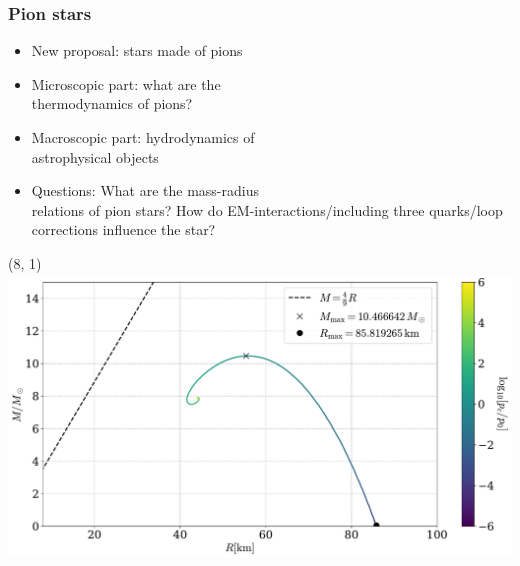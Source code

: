 \documentclass[aspectratio=169]{beamer}
\author{Martin Johnsrud}
\begin{document}

    \begin{frame}
        \frametitle{Pion stars}
        \begin{itemize}
            \item New proposal: stars made of pions
            \item Microscopic part: what are the\\ thermodynamics of pions?
            \item Macroscopic part: hydrodynamics of\\
             astrophysical objects
            \item Questions: What are the mass-radius\\
            relations of pion stars?
            How do EM-interactions/including three quarks/loop corrections influence the star?
        \end{itemize}

        \begin{textblock}{8}(8, 1)
            \includegraphics[width=\textwidth]{../../scripts/figurer/pion_star/mass_radius_pion_star.pdf}
        \end{textblock}


    \end{frame}
\end{document}
